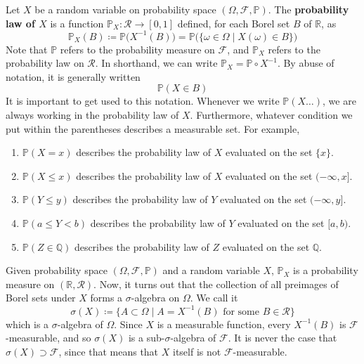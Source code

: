 \documentclass{article}
\begin{document}
    \begin{definition}
      Let $X$ be a random variable on probability space $(\Omega, \mathcal{F}, \mathbb{P})$. The \textbf{probability law of $X$} is a function $\mathbb{P}_X : \mathcal{R} \longrightarrow [0, 1]$ defined, for each Borel set $B$ of $\mathbb{R}$, as 
      \begin{equation}
        \mathbb{P}_X (B) \coloneqq \mathbb{P} \big( X^{-1}(B) \big) = \mathbb{P} \big( \{\omega \in \Omega \mid X(\omega) \in B\} \big)
      \end{equation}
      Note that $\mathbb{P}$ refers to the probability measure on $\mathcal{F}$, and $\mathbb{P}_X$ refers to the probability law on $\mathcal{R}$. In shorthand, we can write $\mathbb{P}_X = \mathbb{P} \circ X^{-1}$. By abuse of notation, it is generally written
      \begin{equation}
        \mathbb{P}(X \in B)
      \end{equation}
      It is important to get used to this notation. Whenever we write $\mathbb{P}(X \ldots)$, we are always working in the probability law of $X$. Furthermore, whatever condition we put within the parentheses describes a measurable set. For example, 
      \begin{enumerate}
        \item $\mathbb{P}(X = x)$ describes the probability law of $X$ evaluated on the set $\{x\}$. 
        \item $\mathbb{P}(X \leq x)$ describes the probability law of $X$ evaluated on the set $(-\infty, x]$. 
        \item $\mathbb{P}(Y \leq y)$ describes the probability law of $Y$ evaluated on the set $(-\infty, y]$.
        \item $\mathbb{P}(a \leq Y < b)$ describes the probability law of $Y$ evaluated on the set $[a, b)$. 
        \item $\mathbb{P}(Z \in \mathbb{Q})$ describes the probability law of $Z$ evaluated on the set $\mathbb{Q}$. 
      \end{enumerate}
    \end{definition}

    \begin{theorem}
      Given probability space $(\Omega, \mathcal{F}, \mathbb{P})$ and a random variable $X$, $\mathbb{P}_X$ is a probability measure on $(\mathbb{R}, \mathcal{R})$. Now, it turns out that the collection of all preimages of Borel sets under $X$ forms a $\sigma$-algebra on $\Omega$. We call it 
      \begin{equation}
        \sigma(X) \coloneqq \big\{ A \subset \Omega \mid A = X^{-1}(B) \text{ for some } B \in \mathcal{R} \big\}
      \end{equation}
      which is a $\sigma$-algebra of $\Omega$. Since $X$ is a measurable function, every $X^{-1}(B)$ is $\mathcal{F}$-measurable, and so $\sigma(X)$ is a sub-$\sigma$-algebra of $\mathcal{F}$. It is never the case that $\sigma(X) \supset \mathcal{F}$, since that means that $X$ itself is not $\mathcal{F}$-measurable. 
    \end{theorem}
\end{document}
